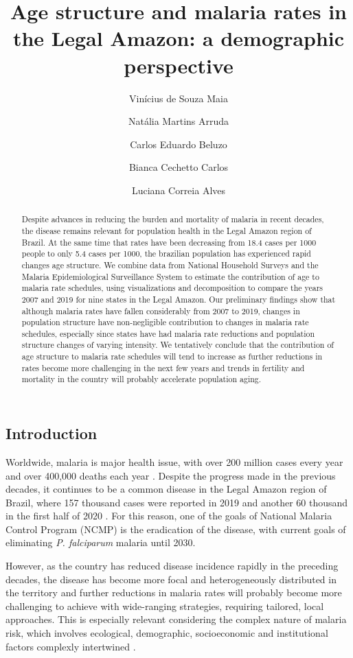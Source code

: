 \documentclass[
  12pt,
]{article}
\title{Age structure and malaria rates in the Legal Amazon: a demographic perspective}
\author{Vinícius de Souza Maia \and Natália Martins Arruda \and Carlos Eduardo Beluzo \and Bianca Cechetto Carlos \and Luciana Correia Alves}
\date{}
\begin{document}
\maketitle
\begin{abstract}
Despite advances in reducing the burden and mortality of malaria in recent decades, the disease remains relevant for population health in the Legal Amazon region of Brazil. At the same time that rates have been decreasing from 18.4 cases per 1000 people to only 5.4 cases per 1000, the brazilian population has experienced rapid changes age structure. We combine data from National Household Surveys and the Malaria Epidemiological Surveillance System to estimate the contribution of age to malaria rate schedules, using visualizations and decomposition to compare the years 2007 and 2019 for nine states in the Legal Amazon. Our preliminary findings show that although malaria rates have fallen considerably from 2007 to 2019, changes in population structure have non-negligible contribution to changes in malaria rate schedules, especially since states have had malaria rate reductions and population structure changes of varying intensity. We tentatively conclude that the contribution of age structure to malaria rate schedules will tend to increase as further reductions in rates become more challenging in the next few years and trends in fertility and mortality in the country will probably accelerate population aging.
\end{abstract}

\hypertarget{introduction}{%
\subsection{Introduction}\label{introduction}}

Worldwide, malaria is major health issue, with over 200 million cases every year and over 400,000 deaths each year \citep{WorldMalariaReport}. Despite the progress made in the previous decades, it continues to be a common disease in the Legal Amazon region of Brazil, where 157 thousand cases were reported in 2019 and another 60 thousand in the first half of 2020 \citep{saudeBoletimEpidemiologicoMalaria2020}. For this reason, one of the goals of National Malaria Control Program (NCMP) is the eradication of the disease, with current goals of eliminating \emph{P. falciparum} malaria until 2030.

However, as the country has reduced disease incidence rapidly in the preceding decades, the disease has become more focal and heterogeneously distributed in the territory \citep{lanaTopQuantifyingUnequal2021} and further reductions in malaria rates will probably become more challenging\citep{ferreiraChallengesMalariaElimination2016} to achieve with wide-ranging strategies, requiring tailored, local approaches. This is especially relevant considering the complex nature of malaria risk, which involves ecological, demographic, socioeconomic and institutional factors complexly intertwined \citep{worldhealthorganizationGlobalTechnicalStrategy2015}.
\end{document}

